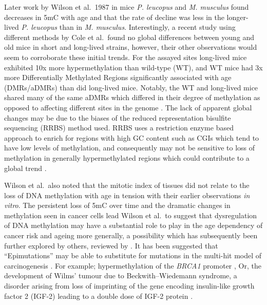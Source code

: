 \documentclass[
]{book}
\begin{document}
Later work by Wilson et al.~1987 \citep{Wilson1987} in mice \emph{P. leucopus} and \emph{M. musculus} found decreases in 5mC with age and that the rate of decline was less in the longer-lived \emph{P. leucopus} than in \emph{M. musculus}. Interestingly, a recent study using different methods by Cole et al.~found no global differences between young and old mice in short and long-lived strains, however, their other observations would seem to corroborate these initial trends. For the assayed sites long-lived mice exhibited 10x more hypermethylation than wild-type (WT), and WT mice had 3x more Differentially Methylated Regions significantly associated with age (DMRs/aDMRs) than did long-lived mice. Notably, the WT and long-lived mice shared many of the same aDMRs which differed in their degree of methylation as opposed to affecting different sites in the genome \citep{Cole2017}. The lack of apparent global changes may be due to the biases of the reduced representation bisulfite sequencing (RRBS) method used. RRBS uses a restriction enzyme based approach to enrich for regions with high GC content such as CGIs which tend to have low levels of methylation, and consequently may not be sensitive to loss of methylation in generally hypermethylated regions which could contribute to a global trend \citep{Meissner2005}.

Wilson et al.~also noted that the mitotic index of tissues did not relate to the loss of DNA methylation with age in tension with their earlier observations \emph{in vitro}. The persistent loss of 5mC over time and the dramatic changes in methylation seen in cancer cells lead Wilson et al.~to suggest that dysregulation of DNA methylation may have a substantial role to play in the age dependency of cancer risk and ageing more generally, a possibility which has subsequently been further explored by others, reviewed by \citet{Feinberg2004}. It has been suggested that ``Epimutations'' may be able to substitute for mutations in the multi-hit model of carcinogenesis \citep{Knudson1971}. For example; hypermethylation of the \emph{BRCA1} promoter \citep{Esteller2000}, Or, the development of Wilms' tumour due to Beckwith--Wiedemann syndrome, a disorder arising from loss of imprinting of the gene encoding insulin-like growth factor 2 (IGF-2) leading to a double dose of IGF-2 protein \citep{Feinberg2018}.
\end{document}
